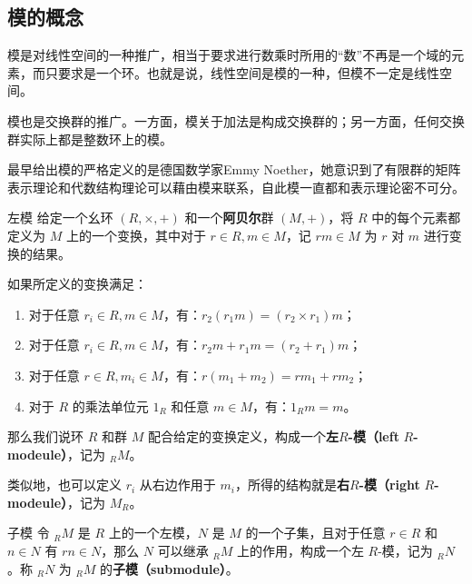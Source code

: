 



\subsection{模的概念}


模是对线性空间的一种推广，相当于要求进行数乘时所用的“数”不再是一个域的元素，而只要求是一个环。也就是说，线性空间是模的一种，但模不一定是线性空间。


模也是交换群的推广。一方面，模关于加法是构成交换群的；另一方面，任何交换群实际上都是整数环上的模。


最早给出模的严格定义的是德国数学家Emmy Noether，她意识到了有限群的矩阵表示理论和代数结构理论可以藉由模来联系，自此模一直都和表示理论密不可分。


\begin{definition}{左模}
给定一个幺环 $(R, \times, +)$ 和一个\textbf{阿贝尔}群 $(M, +)$，将 $R$ 中的每个元素都定义为 $M$ 上的一个变换，其中对于 $r\in R, m\in M$，记 $rm\in M$ 为 $r$ 对 $m$ 进行变换的结果。

如果所定义的变换满足：
\begin{enumerate}
\item 对于任意 $r_i\in R, m\in M$，有：$r_2(r_1m)=(r_2\times r_1)m$；
\item 对于任意 $r_i\in R, m\in M$，有：$r_2m+r_1m=(r_2+r_1)m$；
\item 对于任意 $r\in R, m_i\in M$，有：$r(m_1+m_2)=rm_1+rm_2$；
\item 对于 $R$ 的乘法单位元 $1_R$ 和任意 $m\in M$，有：$1_Rm=m$。
\end{enumerate}

那么我们说环 $R$ 和群 $M$ 配合给定的变换定义，构成一个\textbf{左}$R$\textbf{-模（left} $R$\textbf{-modeule）}，记为 $_RM$。
\end{definition}

类似地，也可以定义 $r_i$ 从右边作用于 $m_i$，所得的结构就是\textbf{右}$R$\textbf{-模（right} $R$\textbf{-modeule）}，记为 $M_R$。


\begin{definition}{子模}
令 $_RM$ 是 $R$ 上的一个左模，$N$ 是 $M$ 的一个子集，且对于任意 $r\in R$ 和 $n\in N$ 有 $rn\in N$，那么 $N$ 可以继承 $_RM$ 上的作用，构成一个左 $R$-模，记为 $_RN$。称 $_RN$ 为 $_RM$ 的\textbf{子模（submodule）}。
\end{definition}


